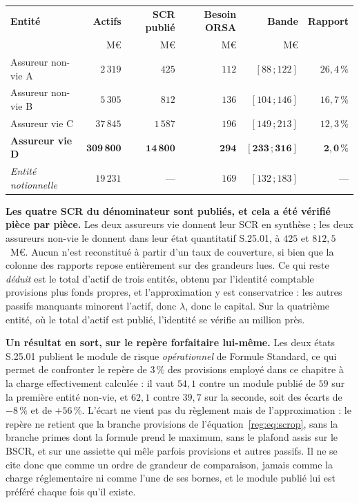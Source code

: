 \begin{center}\small
\renewcommand{\arraystretch}{1.25}
\begin{tabular}{@{}l r r r r r@{}}
\toprule
\textbf{Entité} & \textbf{Actifs} & \textbf{SCR publié} & \textbf{Besoin ORSA} &
\textbf{Bande} & \textbf{Rapport} \\
 & M\euro & M\euro & M\euro & M\euro & \\
\midrule
Assureur non-vie A & $2\,319$ & $425$ & $112$ & $[88\,;122]$ & $26{,}4\,\%$ \\
Assureur non-vie B & $5\,305$ & $812$ & $136$ & $[104\,;146]$ & $16{,}7\,\%$ \\
Assureur vie C & $37\,845$ & $1\,587$ & $196$ & $[149\,;213]$ & $12{,}3\,\%$ \\
\textbf{Assureur vie D} & $\mathbf{309\,800}$ & $\mathbf{14\,800}$ & $\mathbf{294}$ &
$\mathbf{[233\,;316]}$ & $\mathbf{2{,}0\,\%}$ \\
\midrule
\emph{Entité notionnelle} & $19\,231$ & --- & $169$ & $[132\,;183]$ & --- \\
\bottomrule
\end{tabular}
\end{center}

\vspace{2pt}
\noindent \textbf{Les quatre SCR du dénominateur sont publiés, et cela a été vérifié
pièce par pièce.} Les deux assureurs vie donnent leur SCR en synthèse ; les deux
assureurs non-vie le donnent dans leur état quantitatif S.25.01, à $425$ et
$812{,}5$~M\euro. Aucun n'est reconstitué à partir d'un taux de couverture, si bien que la
colonne des rapports repose entièrement sur des grandeurs lues. Ce qui reste \emph{déduit} est
le total d'actif de trois entités, obtenu par l'identité comptable provisions plus fonds
propres, et l'approximation y est conservatrice : les autres passifs manquants
minorent l'actif, donc $\lambda$, donc le capital. Sur la quatrième entité, où le total d'actif
est publié, l'identité se vérifie au million près.

\vspace{2pt}
\noindent \textbf{Un résultat en sort, sur le repère forfaitaire lui-même.} Les deux états
S.25.01 publient le module de risque \emph{opérationnel} de Formule Standard, ce qui
permet de confronter le repère de $3\,\%$ des provisions employé dans ce chapitre à la charge
effectivement calculée : il vaut $54{,}1$ contre un module publié de $59$ sur la première entité
non-vie, et $62{,}1$ contre $39{,}7$ sur la seconde, soit des écarts de $-8\,\%$ et de
$+56\,\%$. L'écart ne vient pas du règlement mais de l'approximation : le repère ne retient que la
branche provisions de l'équation~\eqref{reg:eq:scrop}, sans la branche primes dont la formule prend
le maximum, sans le plafond assis sur le BSCR, et sur une assiette qui mêle parfois provisions et
autres passifs. Il ne se cite donc que comme un ordre de grandeur de comparaison, jamais comme la
charge réglementaire ni comme l'une de ses bornes, et le module publié lui est préféré chaque fois
qu'il existe.

